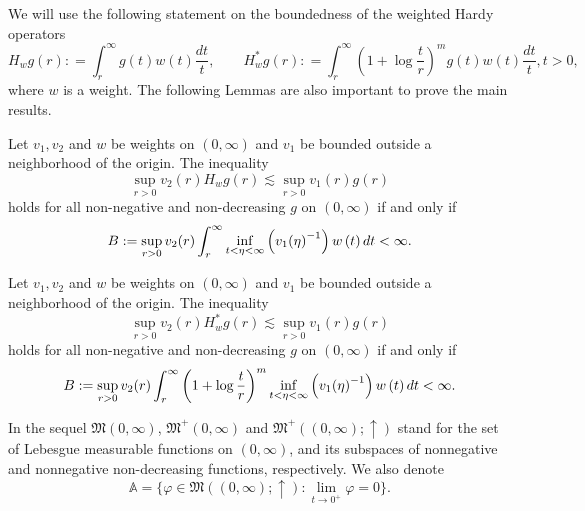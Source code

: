 \documentclass[11pt, twoside, leqno]{article}
\begin{document}
We will use the following statement on the boundedness of the weighted Hardy operators
\begin{equation*}
H_w^{}g(r): = \int_r^\infty  {g(t)w(t)\frac{{dt}}{t}},\qquad  H_w^*g(r): = \int_r^\infty  {{{\left( {1 + \log \frac{t}{r}} \right)}^m}g(t)w(t)\frac{{dt}}{t}}, t>0,
\end{equation*}
where $w$ is a weight. The following Lemmas are also important to prove the main results.

\begin{lem}[\cite{Gu1}]\label{Gu2}
	Let $v_1, v_2$ and $w$ be weights on $\left( {0,\infty } \right)$ and $v_1$ be bounded outside a neighborhood of the origin. The inequality
	\begin{equation}\label{Gu21}
	\mathop {\sup }\limits_{r > 0} {v_2}(r){H_w}g(r) \lesssim \mathop {\sup }\limits_{r > 0} {v_1}(r)g(r)
	\end{equation}
	holds for all non-negative and non-decreasing $g$ on $\left( {0,\infty } \right)$ if and only if
	\begin{equation*}
	B: = \mathop {\sup }\limits_{r > 0} {v_2}(r)\int_r^\infty  {\mathop {{\rm{inf}}}\limits_{t < \eta  < \infty } \left( {{v_1}{{(\eta )}^{ - 1}}} \right)w\left( t \right)dt}  < \infty.
	\end{equation*}
\end{lem}

\begin{lem}[\cite{Gu1}]\label{Gu3}
	Let $v_1, v_2$ and $w$ be weights on $\left( {0,\infty } \right)$ and $v_1$ be bounded outside a neighborhood of the origin. The inequality
	\begin{equation}\label{Gu31}
	\mathop {\sup }\limits_{r > 0} {v_2}(r)H_w^*g(r) \lesssim \mathop {\sup }\limits_{r > 0} {v_1}(r)g(r)
	\end{equation}
	holds for all non-negative and non-decreasing $g$ on $\left( {0,\infty } \right)$ if and only if
	\begin{equation*}
	B: = \mathop {\sup }\limits_{r > 0} {v_2}(r)\int_r^\infty  {{{\left( {1 + \log \frac{t}{r}} \right)}^m}\mathop {{\rm{inf}}}\limits_{t < \eta  < \infty } \left( {{v_1}{{(\eta )}^{ - 1}}} \right)w\left( t \right)dt}  < \infty.
	\end{equation*}
\end{lem}

In the sequel $\mathfrak{M}(0,\infty)$, ${\mathfrak{M}}^+(0,\infty)$ and ${\mathfrak{M}}^+((0,\infty);\uparrow)$ stand for the set of Lebesgue measurable functions on $(0,\infty)$, and its subspaces of nonnegative and nonnegative non-decreasing functions, respectively. We also denote
$$\mathbb{A} = \{ \varphi  \in \mathfrak{M}((0,\infty ); \uparrow ):\mathop {\lim }\limits_{t \to {0^ + }} \varphi  = 0\}.$$
\end{document}
